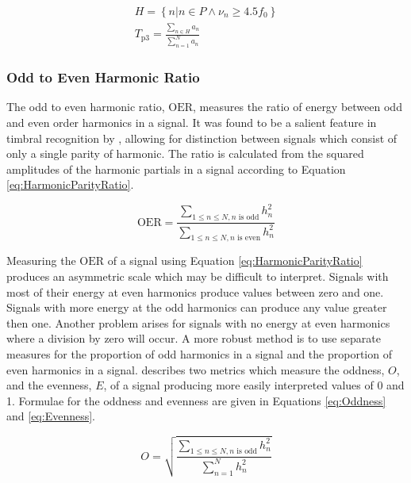 			\begin{gather}
				H = \left\{ n | n \in P \land \nu_{n} \geq 4.5f_{0} \right\} \nonumber \\
				T_{\mathrm{p}3} = \frac{\sum_{n \in H} a_{n}}{\sum_{n = 1}^{N} a_{n}}
				\label{eq:PeakTristimulus3}
			\end{gather}

		\subsubsection*{Odd to Even Harmonic Ratio}
			The odd to even harmonic ratio, $\mathrm{OER}$, measures the ratio of energy between odd and even
			order harmonics in a signal. It was found to be a salient feature in timbral recognition by
			\citet{hall2010importance}, allowing for distinction between signals which consist of only a single
			parity of harmonic. The ratio is calculated from the squared amplitudes of the harmonic partials in
			a signal according to Equation \ref{eq:HarmonicParityRatio}.
			
			\begin{equation}
				\mathrm{OER} = \frac{\sum_{1 \leq n \leq N, n \text{ is odd}} h_{n}^{2}}
					       {\sum_{1 \leq n \leq N, n \text{ is even}} h_{n}^{2}}
				\label{eq:HarmonicParityRatio}
			\end{equation}

			Measuring the $\mathrm{OER}$ of a signal using Equation \ref{eq:HarmonicParityRatio} produces an
			asymmetric scale which may be difficult to interpret.  Signals with most of their energy at even
			harmonics produce values between zero and one.  Signals with more energy at the odd harmonics can
			produce any value greater then one. Another problem arises for signals with no energy at even
			harmonics where a division by zero will occur. A more robust method is to use separate measures for
			the proportion of odd harmonics in a signal and the proportion of even harmonics in a signal.
			\citet{lukasik2005towards} describes two metrics which measure the oddness, $O$, and the evenness,
			$E$, of a signal producing more easily interpreted values of 0 and 1. Formulae for the oddness and
			evenness are given in Equations \ref{eq:Oddness} and \ref{eq:Evenness}.

			\begin{equation}
				O = \sqrt{\frac{\sum_{1 \leq n \leq N, n \text{ is odd}} h_{n}^{2}}
					       {\sum_{n = 1}^{N} h_{n}^{2}}}
				\label{eq:Oddness}
			\end{equation}

